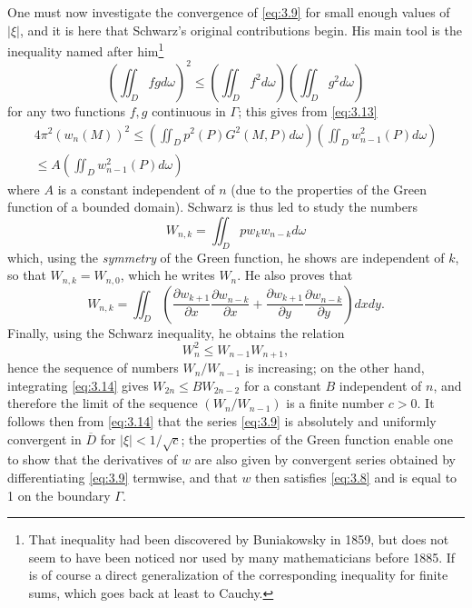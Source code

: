 \documentclass[12pt,a4paper,leqno,twoside]{extbook}
\newcommand{\pder}[2]{\frac{\partial #1}{\partial #2}}
\begin{document}
One must now investigate the convergence of \eqref{eq:3.9} for small enough values of \(|\xi|\), and it is here that Schwarz's original contributions begin. His main tool is the inequality named after him\footnote{That inequality had been discovered by Buniakowsky in 1859, but does not seem to have been noticed nor used by many mathematicians before 1885. If is of course a direct generalization of the corresponding inequality for finite sums, which goes back at least to Cauchy.}
\[
    \left( \iint_D fg d\omega \right)^2 \leq \left( \iint_D f^2 d\omega \right) \left( \iint_D g^2 d\omega \right)
\]
for any two functions \(f, g\) continuous in \(\Gamma\); this gives from \eqref{eq:3.13}
\begin{equation}
    \label{eq:3.14}
    \begin{gathered}
    4\pi^2\left(w_n(M)\right)^2 \leq \left(\iint_D p^2(P)G^2(M, P)d\omega\right) \left(\iint_D w^2_{n-1}(P)d\omega\right) \\
    \leq A \left( \iint_D w^2_{n-1}(P)d\omega \right)
    \end{gathered}
\end{equation}
where \(A\) is a constant independent of \(n\) (due to the properties of the Green function of a bounded domain). Schwarz is thus led to study the numbers
\begin{equation}
    \label{eq:3.15}
    W_{n, k} = \iint_D p w_k w_{n-k} d\omega
\end{equation}
which, using the \emph{symmetry} of the Green function, he shows are independent of \(k\), so that \(W_{n, k} = W_{n, 0}\), which he writes \(W_n\). He also proves that
\begin{equation}
    \label{eq:3.16}
    W_{n, k} = \iint_D \left(\pder{w_{k+1}}{x} \pder{w_{n-k}}{x} + \pder{w_{k+1}}{y} \pder{w_{n-k}}{y}\right) dxdy.
\end{equation}
Finally, using the Schwarz inequality, he obtains the relation
\begin{equation}
    \label{eq:3.17}
    W_n^2 \leq W_{n-1} W_{n+1},
\end{equation}
hence the sequence of numbers \(W_n/W_{n-1}\) is increasing; on the other hand, integrating \eqref{eq:3.14} gives \(W_{2n} \leq BW_{2n-2}\) for a constant \(B\) independent of \(n\), and therefore the limit of the sequence \((W_n/W_{n-1})\) is a finite number \(c > 0\). It follows then from \eqref{eq:3.14} that the series \eqref{eq:3.9} is absolutely and uniformly convergent in \(\overline{D}\) for \(|\xi| < 1/ \sqrt{c}\); the properties of the Green function enable one to show that the derivatives of \(w\) are also given by convergent series obtained by differentiating \eqref{eq:3.9} termwise, and that \(w\) then satisfies \eqref{eq:3.8} and is equal to 1 on the boundary \(\Gamma\).
\end{document}
